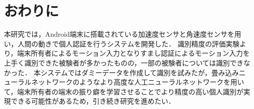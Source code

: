 \section{おわりに}
本研究では，Android端末に搭載されている加速度センサと角速度センサを用い，人間の動きで個人認証を行うシステムを開発した．
識別精度の評価実験より，端末所有者によるモーション入力となりすまし認証によるモーション入力を上手く識別できた被験者が多かったものの，一部の被験者については識別できなかった．
本システムではダミーデータを作成して識別を試みたが，畳み込みニューラルネットワークのようなより高度な人工ニューラルネットワークを用いて，端末所有者の端末の振り癖を学習させることでより精度の高い個人識別が実現できる可能性があるため，引き続き研究を進めたい．
